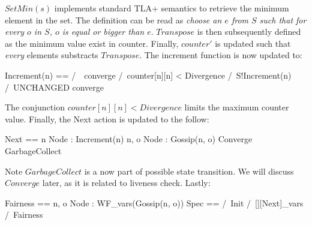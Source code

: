 \documentclass{report}
\begin{document}
$SetMin(s)$ implements standard TLA+ semantics to retrieve the minimum element
in the set. The definition can be read as \textit{choose an $e$ from $S$ such
that for every $o$ in $S$, $o$ is equal or bigger than $e$}. $Transpose$ is then
subsequently defined as the minimum value exist in counter. Finally, $counter'$
is updated such that \textit{every} elements substracts $Transpose$. The
increment function is now updated to: \newline
\begin{tla}
    Increment(n) ==
        /\ ~converge
        /\ counter[n][n] < Divergence
        /\ S!Increment(n)
        /\ UNCHANGED converge
\end{tla}
\begin{tlatex}
%
%
%
%
%
\end{tlatex}

The conjunction $counter[n][n] < Divergence$ limits the maximum counter value.
Finally, the Next action is updated to the follow:\newline

\begin{tla}
    Next ==
        \/ \E n \in Node : Increment(n)
        \/ \E n, o \in Node : Gossip(n, o)
        \/ Converge
        \/ GarbageCollect
\end{tla}
\begin{tlatex}
%
%
%
%
%
\end{tlatex}

Note $GarbageCollect$ is a now part of possible state transition. We will
discuss $Converge$ later, as it is related to liveness check. Lastly:\newline

\begin{tla}
    Fairness == \A n, o \in Node : WF_vars(Gossip(n, o))
    Spec ==
        /\ Init
        /\ [][Next]_vars
        /\ Fairness
\end{tla}
\begin{tlatex}
%
%
%
%
\end{tlatex}
\end{document}
